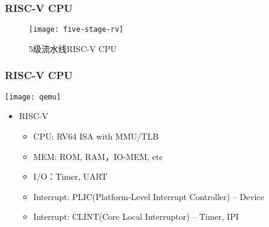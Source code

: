 

\begin{frame}
	\frametitle{RISC-V CPU}

\begin{figure}
\centering
\texttt{[image: five-stage-rv]}

\caption{5级流水线RISC-V CPU}
\end{figure}

\end{frame}

\begin{frame}
	\frametitle{RISC-V CPU}
	\centering
	\texttt{[image: qemu]}
	
	\begin{itemize}
		
		\item RISC-V
		\begin{itemize}
			\item CPU: RV64 ISA with MMU/TLB
			\item MEM: ROM, RAM，IO-MEM, etc
			\item I/O：Timer, UART
			\item Interrupt: PLIC(Platform-Level Interrupt Controller) -- Device
			\item Interrupt: CLINT(Core Local Interruptor) -- Timer, IPI 
		\end{itemize}

	\end{itemize}	
	
\end{frame}


